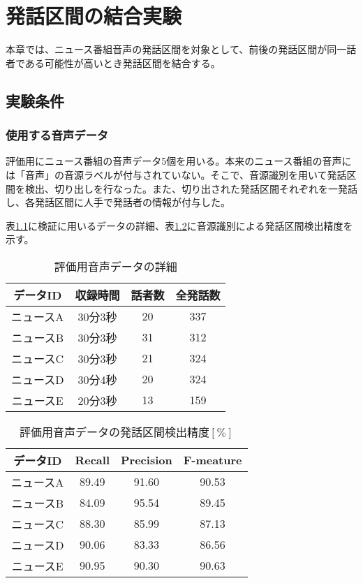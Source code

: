 \chapter{発話区間の結合実験}
本章では、ニュース番組音声の発話区間を対象として、前後の発話区間が同一話者である可能性が高いとき発話区間を結合する。
\section{実験条件}
\subsection{使用する音声データ}
\par
評価用にニュース番組の音声データ5個を用いる。本来のニュース番組の音声には「音声」の音源ラベルが付与されていない。そこで、音源識別を用いて発話区間を検出、切り出しを行なった。また、切り出された発話区間それぞれを一発話し、各発話区間に人手で発話者の情報が付与した。\par
表\ref{table:test_detail}に検証に用いるデータの詳細、表\ref{table:test_detail_RPF}に音源識別による発話区間検出精度を示す。

\begin{table}[htb]
  \begin{center}
    \caption{評価用音声データの詳細 \label{table:test_detail}}
    \begin{tabular}{|c||c|c|c|} \hline
      データID & 収録時間 & 話者数 & 全発話数 \\ \hline
      ニュースA & 30分3秒 & 20 & 337 \\ \hline
      ニュースB & 30分3秒 & 31 & 312\\ \hline
      ニュースC & 30分3秒 & 21 & 324 \\ \hline
      ニュースD & 30分4秒 & 20 & 324\\ \hline
      ニュースE & 20分3秒 & 13 & 159\\ \hline
    \end{tabular}
  \end{center}
\end{table}

\begin{table}[htb]
  \begin{center}
    \caption{評価用音声データの発話区間検出精度$[\%]$ \label{table:test_detail_RPF}}
    \begin{tabular}{|c||c|c|c|} \hline
      データID & Recall & Precision & F-meature \\ \hline
      ニュースA & 89.49 & 91.60 & 90.53 \\ \hline
      ニュースB & 84.09 & 95.54 & 89.45\\ \hline
      ニュースC & 88.30 & 85.99 & 87.13 \\ \hline
      ニュースD & 90.06 & 83.33 & 86.56\\ \hline
      ニュースE & 90.95 & 90.30 & 90.63\\ \hline
    \end{tabular}
  \end{center}
\end{table}

